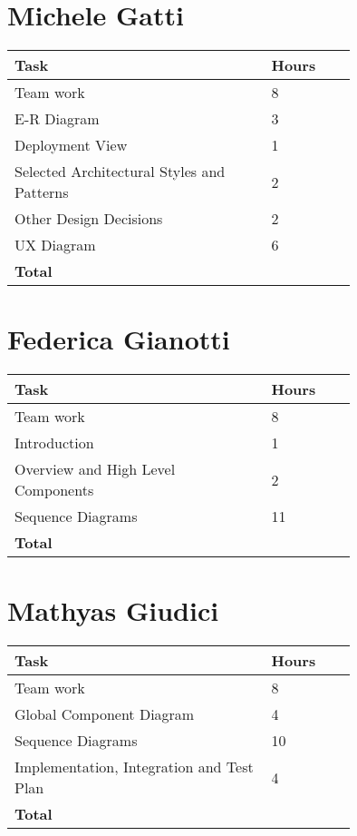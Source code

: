 \section{Michele Gatti}

\smallskip
\begin{center}
\begin{tabular}{ | p{0.75\linewidth} | l | }
  \hline
    \textbf{Task} & \textbf{Hours }\\ \hline
     Team work & 8 \\ \hline
     E-R Diagram & 3 \\ \hline
     Deployment View & 1 \\ \hline
     Selected Architectural Styles and Patterns & 2 \\ \hline
     Other Design Decisions & 2 \\ \hline
     UX Diagram & 6 \\ \hline
    \textbf{Total} & \textbf{} \\ \hline
\end{tabular}
\end{center}
\smallskip


\section{Federica Gianotti}

\smallskip
\begin{center}
\begin{tabular}{ | p{0.75\linewidth} | l | }
  \hline
    \textbf{Task} & \textbf{Hours }\\ \hline
    Team work & 8 \\ \hline
    Introduction & 1 \\ \hline
    Overview and High Level Components & 2 \\ \hline
    Sequence Diagrams & 11 \\ \hline
   \textbf{Total} & \textbf{} \\ \hline
\end{tabular}
\end{center}
\smallskip

\section{Mathyas Giudici}

\smallskip
\begin{center}
\begin{tabular}{ | p{0.75\linewidth} | l | }
  \hline
    \textbf{Task} & \textbf{Hours }\\ \hline
    Team work & 8 \\ \hline
    Global Component Diagram & 4 \\ \hline
    Sequence Diagrams & 10 \\ \hline
    Implementation, Integration and Test Plan & 4 \\ \hline
   \textbf{Total} & \textbf{} \\ \hline
\end{tabular}
\end{center}

\clearpage
